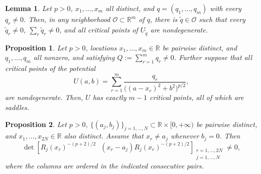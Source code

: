\documentclass[10pt,a4paper]{amsart}
\newtheorem{proposition}{Proposition}
\newtheorem{lemma}{Lemma}
\newcommand{\bbR}{\mathbb{R}}
\begin{document}
	\begin{lemma}\label{lem:generic-morse}
		Let $p>0$, $x_1,\ldots,x_m$ all distinct, and $q=(q_1,\ldots,q_m)$ with every $q_r\neq0$. Then, in any neighborhood $\mathcal O \subset \bbR^m$ of $q$, there is $\widetilde q\in\mathcal O$ such that every $\widetilde q_r \neq 0$, $\sum_r\widetilde q_r\neq0$, and all critical points of $U_{\widetilde q}$ are nondegenerate.
	\end{lemma}

	\begin{proposition}\label{prop:morse-count}
		Let $p>0$, locations $x_1 , \ldots , x_m \in \mathbb{R}$ be pairwise distinct, and $q_1, \ldots , q_m$ all nonzero, and satisfying $Q:=\sum_{r=1}^m q_r\neq0$. Further suppose that all critical points of the potential 
		\[
		U(a,b)=\sum_{r=1}^m \frac{ q_r}{\big((a-x_r)^2+b^2\big)^{p/2}},
		\]
		are nondegenerate. Then, $U$ has exactly $m-1$ critical points, all of which are saddles.
	\end{proposition}

	\begin{proposition}\label{prop:evaluation}
		Let $p>0$, $\lbrace (a_j,b_j)\rbrace_{j=1,\ldots,N} \subset  \bbR \times [0,+\infty) $ be pairwise distinct, and $x_1,\ldots,x_{2N}\in\bbR$ also distinct. Assume that $x_r\neq a_j$ whenever $b_j=0$. Then
		\begin{equation}\label{eq:evaluation-det}
			\det\left[
			R_j(x_r)^{-(p+2)/2}\ \ \ (x_r-a_j)R_j(x_r)^{-(p+2)/2}
			\right]_{\substack{r=1,\ldots,2N\\ j=1,\ldots,N}}
			\neq0,
		\end{equation}
		where the columns are ordered in the indicated consecutive pairs.
	\end{proposition}
\end{document}
